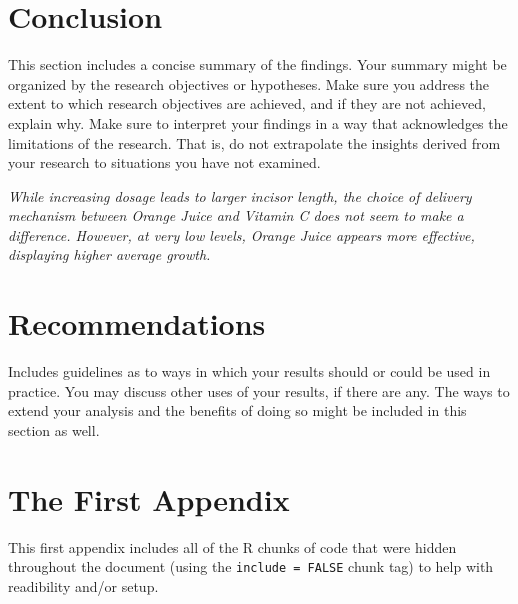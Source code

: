 \documentclass[12pt,oneside]{chicagocapstone}
\begin{document}
\chapter*{Conclusion}\label{conclusion}

This section includes a concise summary of the findings. Your summary
might be organized by the research objectives or hypotheses. Make sure
you address the extent to which research objectives are achieved, and if
they are not achieved, explain why. Make sure to interpret your findings
in a way that acknowledges the limitations of the research. That is, do
not extrapolate the insights derived from your research to situations
you have not examined.

\emph{While increasing dosage leads to larger incisor length, the choice
of delivery mechanism between Orange Juice and Vitamin C does not seem
to make a difference. However, at very low levels, Orange Juice appears
more effective, displaying higher average growth.}

\chapter*{Recommendations}\label{recommendations}

Includes guidelines as to ways in which your results should or could be
used in practice. You may discuss other uses of your results, if there
are any. The ways to extend your analysis and the benefits of doing so
might be included in this section as well.

\appendix

\chapter{The First Appendix}\label{the-first-appendix}

This first appendix includes all of the R chunks of code that were
hidden throughout the document (using the \texttt{include\ =\ FALSE}
chunk tag) to help with readibility and/or setup.
\end{document}
